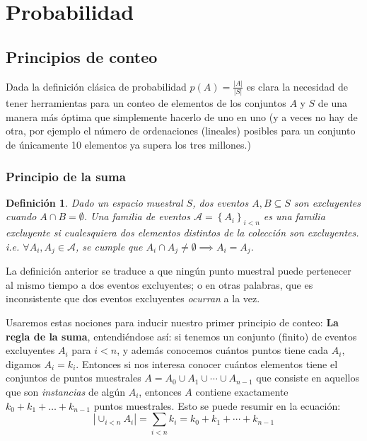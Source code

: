 \documentclass[spanish]{report}
\newtheorem{defi}[thm]{Definición}
\newcommand{\card}[1]{\left|#1 \right|}
\begin{document}
	
\section{Probabilidad}


\subsection{Principios de conteo}

Dada la definición clásica de probabilidad $p(A) = \frac{\card{A}}{\card{S}}$ es clara la necesidad de tener herramientas para un conteo de elementos de los conjuntos $A$ y $S$ de una manera más óptima que simplemente hacerlo de uno en uno (y a veces no hay de otra, por ejemplo el número de ordenaciones (lineales) posibles para un conjunto de únicamente 10 elementos ya supera los tres millones.)

\subsubsection{Principio de la suma}
\begin{defi}
	Dado un espacio muestral $S$, dos eventos $A, B \subseteq S$ son \emph{excluyentes} cuando $A \cap B = \emptyset$. 
	Una familia de eventos $\mathcal{A}= \left\lbrace A_i \right\rbrace_{i<n}$ es una \emph{familia excluyente} si cualesquiera dos elementos distintos de la colección son excluyentes. i.e. $\forall A_i, A_j \in \mathcal{A}$, se cumple que $A_i \cap A_j \neq \emptyset \implies A_i = A_j$.
\end{defi}

La definición anterior se traduce a que ningún punto muestral puede pertenecer al mismo tiempo a dos eventos excluyentes; o en otras palabras, que es inconsistente que dos eventos excluyentes \emph{ocurran} a la vez.

Usaremos estas nociones para inducir nuestro primer principio de conteo: \textbf{La regla de la suma}, entendiéndose así:
si tenemos un conjunto (finito) de eventos excluyentes $A_i$ para $i<n$, y además conocemos cuántos puntos tiene cada $A_i$, digamos $A_i = k_i$. Entonces si nos interesa conocer cuántos elementos tiene el conjuntos de puntos muestrales $A = A_0 \cup A_1 \cup \cdots \cup A_{n-1}$ que consiste en aquellos que son \emph{instancias} %
de algún $A_i$, entonces $A$ contiene exactamente $k_0 + k_1 + \ldots + k_{n-1}$ puntos muestrales.
Esto se puede resumir en la ecuación:
\begin{equation}\label{eq_PrincipioSuma}
	\card{\cup_{i<n} A_i} = \sum_{i<n} k_i = k_0 + k_1 + \cdots + k_{n-1}
\end{equation}
\end{document}
